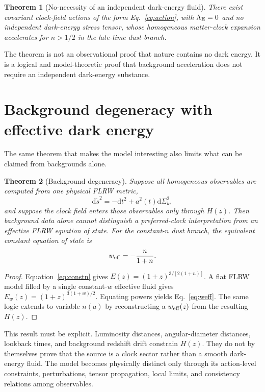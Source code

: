 \documentclass[aps,prd,reprint,nofootinbib,superscriptaddress,longbibliography]{revtex4-2}
\newcommand{\dd}{\mathrm{d}}
\newtheorem{theorem}{Theorem}
\begin{document}
\begin{theorem}[No-necessity of an independent dark-energy fluid]
There exist covariant clock-field actions of the form Eq.~\eqref{eq:action}, with $\Lambda_{\rm E}=0$ and no independent dark-energy stress tensor, whose homogeneous matter-clock expansion accelerates for $n>1/2$ in the late-time dust branch.
\end{theorem}
The theorem is not an observational proof that nature contains no dark energy.  It is a logical and model-theoretic proof that background acceleration does not require an independent dark-energy substance.

\section{Background degeneracy with effective dark energy}

The same theorem that makes the model interesting also limits what can be claimed from backgrounds alone.

\begin{theorem}[Background degeneracy]
Suppose all homogeneous observables are computed from one physical FLRW metric,
\begin{equation}
  \dd\tilde s^2=-\dd t^2+a^2(t)\dd\Sigma_k^2,
\end{equation}
and suppose the clock field enters those observables only through $H(z)$.  Then background data alone cannot distinguish a preferred-clock interpretation from an effective FLRW equation of state.  For the constant-$n$ dust branch, the equivalent constant equation of state is
\begin{equation}
  w_{\rm eff}=-\frac{n}{1+n}.
  \label{eq:weff}
\end{equation}
\end{theorem}

\begin{proof}
Equation~\eqref{eq:constn} gives $E(z)=(1+z)^{3/[2(1+n)]}$.  A flat FLRW model filled by a single constant-$w$ effective fluid gives $E_w(z)=(1+z)^{3(1+w)/2}$.  Equating powers yields Eq.~\eqref{eq:weff}.  The same logic extends to variable $n(a)$ by reconstructing a $w_{\rm eff}(z)$ from the resulting $H(z)$.
\end{proof}

This result must be explicit.  Luminosity distances, angular-diameter distances, lookback times, and background redshift drift constrain $H(z)$.  They do not by themselves prove that the source is a clock sector rather than a smooth dark-energy fluid.  The model becomes physically distinct only through its action-level constraints, perturbations, tensor propagation, local limits, and consistency relations among observables.
\end{document}

